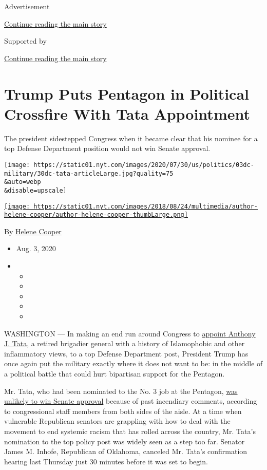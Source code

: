 Advertisement

\protect\hyperlink{after-top}{Continue reading the main story}

Supported by

\protect\hyperlink{after-sponsor}{Continue reading the main story}

\hypertarget{trump-puts-pentagon-in-political-crossfire-with-tata-appointment}{%
\section{Trump Puts Pentagon in Political Crossfire With Tata
Appointment}\label{trump-puts-pentagon-in-political-crossfire-with-tata-appointment}}

The president sidestepped Congress when it became clear that his nominee
for a top Defense Department position would not win Senate approval.

\texttt{[image: https://static01.nyt.com/images/2020/07/30/us/politics/03dc-military/30dc-tata-articleLarge.jpg?quality=75\\\&auto=webp\\\&disable=upscale]}

\href{https://www.nytimes.com/by/helene-cooper}{\texttt{[image: https://static01.nyt.com/images/2018/08/24/multimedia/author-helene-cooper/author-helene-cooper-thumbLarge.png]}}

By \href{https://www.nytimes.com/by/helene-cooper}{Helene Cooper}

\begin{itemize}
\item
  Aug. 3, 2020
\item
  \begin{itemize}
  \item
  \item
  \item
  \item
  \item
  \end{itemize}
\end{itemize}

WASHINGTON --- In making an end run around Congress to
\href{https://www.nytimes.com/2020/08/02/us/politics/anthony-tata-pentagon-nomination.html}{appoint
Anthony J. Tata}, a retired brigadier general with a history of
Islamophobic and other inflammatory views, to a top Defense Department
post, President Trump has once again put the military exactly where it
does not want to be: in the middle of a political battle that could hurt
bipartisan support for the Pentagon.

Mr. Tata, who had been nominated to the No. 3 job at the Pentagon,
\href{https://www.nytimes.com/2020/07/30/us/politics/trump-inhofe-tata-pentagon.html}{was
unlikely to win Senate approval} because of past incendiary comments,
according to congressional staff members from both sides of the aisle.
At a time when vulnerable Republican senators are grappling with how to
deal with the movement to end systemic racism that has rolled across the
country, Mr. Tata's nomination to the top policy post was widely seen as
a step too far. Senator James M. Inhofe, Republican of Oklahoma,
canceled Mr. Tata's confirmation hearing last Thursday just 30 minutes
before it was set to begin.

